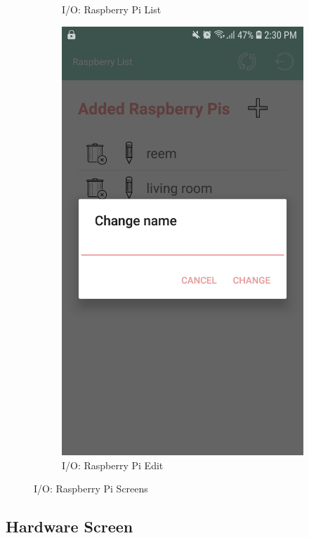 \documentclass[12pt]{paper}
\begin{document}
\begin{figure}[H]
\begin{subfigure}[b]{.4\linewidth}
				\caption{I/O: Raspberry Pi List}
			\end{subfigure}
			\begin{subfigure}[b]{.4\linewidth}
				\includegraphics[width=\linewidth]{img/output_raspberry_edit.jpg}
				\caption{I/O: Raspberry Pi Edit}
			\end{subfigure}
			\caption{I/O: Raspberry Pi Screens}
			\label{output:rp}
		\end{figure}
		
		\newpage\subsection{Hardware Screen}
\end{document}
